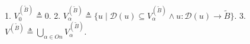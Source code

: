 1. $V_{0}^{(\tilde{B})} \triangleq 0$.
2. $V_{\alpha}^{(\tilde{B})} \triangleq \{u \mid \mathcal{D}(u) \subseteq V_{\alpha}^{(\tilde{B})} \land u: \mathcal{D}(u) \rightarrow \tilde{B}\}$.
3. $V^{(\tilde{B})} \triangleq \bigcup_{\alpha \in On} V_{\alpha}^{(\tilde{B})}$.
